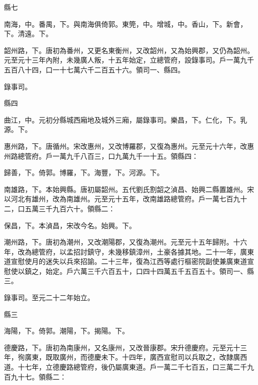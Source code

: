 \begin{pinyinscope}
 縣七



 南海，中。番禺，下。與南海俱倚郭。東筦，中。增城，中。香山，下。新會，下。清遠。下。



 韶州路，下。唐初為番州，又更名東衡州，又改韶州，又為始興郡，又仍為韶州。元至元十三年內附，未幾廣人叛，十五年始定，立總管府，設錄事司。戶一萬九千五百八十四，口一十七萬六千二百五十六。領司一、縣四。



 錄事司。



 縣四



 曲江，中。元初分縣城西廂地及城外三廂，屬錄事司。樂昌，下。仁化，下。乳源。下。



 惠州路，下。唐循州。宋改惠州，又改博羅郡，又復為惠州。元至元十六年，改惠州路總管府。戶一萬九千八百三，口九萬九千一十五。領縣四：



 歸善，下。倚郭。博羅，下。海豐，下。河源。下。



 南雄路，下。本始興縣。唐初屬韶州。五代劉氏割韶之湞昌、始興二縣置雄州。宋以河北有雄州，改為南雄州。元至元十五年，改南雄路總管府。戶一萬七百九十二，口五萬三千九百六十。領縣二：



 保昌，下。本湞昌，宋改今名。始興。下。



 潮州路，下。唐初為潮州，又改潮陽郡，又復為潮州。元至元十五年歸附。十六年，改為總管府，以孟招討鎮守，未幾移鎮漳州，土豪各據其地。二十一年，廣東道宣慰使月的迷失以兵來招諭。二十三年，復為江西等處行樞密院副使兼廣東道宣慰使以鎮之，始定。戶六萬三千六百五十，口四十四萬五千五百五十。領司一、縣三。



 錄事司。至元二十二年始立。



 縣三



 海陽，下。倚郭。潮陽，下。揭陽。下。



 德慶路，下。唐初為南康州，又名康州，又改晉康郡。宋升德慶府。元至元十三年，徇廣東，既取廣州，而德慶未下。十四年，廣西宣慰司以兵取之，改隸廣西道。十七年，立德慶路總管府，後仍屬廣東道。戶一萬二千七百五，口三萬二千九百九十七。領縣二：




\end{pinyinscope}
